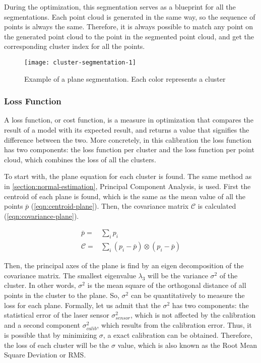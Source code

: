During the optimization, this segmentation serves as a blueprint for all the segmentations. Each point cloud is generated in the same way, so the sequence of points is always the same. Therefore, it is always possible to match any point on the generated point cloud to the point in the segmented point cloud, and get the corresponding cluster index for all the points.

\begin{figure}[h]
    \centering
    \texttt{[image: cluster-segmentation-1]}
    \caption{Example of a plane segmentation. Each color represents a cluster}
    \label{figure:cluster-segmentation-1}
\end{figure}

\subsubsection{Loss Function}

A loss function, or cost function, is a measure in optimization that compares the result of a model with its expected result, and returns a value that signifies the difference between the two. More concretely, in this calibration the loss function has two components: the loss function per cluster and the loss function per point cloud, which combines the loss of all the clusters. 

To start with, the plane equation for each cluster is found. The same method as in \cref{section:normal-estimation}, Principal Component Analysis, is used. First the centroid of each plane is found, which is the same as the mean value of all the points $\bar{p}$ (\cref{eqn:centroid-plane}). Then, the covariance matrix $\mathcal{C}$ is calculated (\cref{eqn:covariance-plane}).

\begin{align}
    \bar{p} = & \sum_{i}{p_i}
        \label{eqn:centroid-plane} \\
    \mathcal{C} = & \sum_{i}{(p_i - \bar{p}) \otimes (p_i - \bar{p})}
        \label{eqn:covariance-plane}
\end{align}

Then, the principal axes of the plane is find by an eigen decomposition of the covariance matrix. The smallest eigenvalue $\lambda_3$ will be the variance $\sigma^2$ of the cluster. In other words, $\sigma^2$ is the mean square of the orthogonal distance of all points in the cluster to the plane. So, $\sigma^2$ can be quantitatively to measure the loss for each plane. Formally, let us admit that the $\sigma^2$ has two components: the statistical error of the laser sensor $\sigma^2_{sensor}$, which is not affected by the calibration and a second component $\sigma^2_{calib}$, which results from the calibration error. Thus, it is possible that by minimizing $\sigma$, a exact calibration can be obtained. Therefore, the loss of each cluster will be the $\sigma$ value, which is also known as the Root Mean Square Deviation or RMS.

